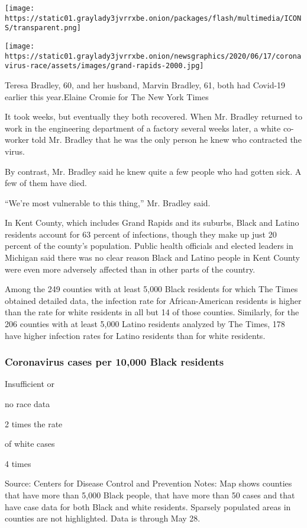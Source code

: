 \texttt{[image: https://static01.graylady3jvrrxbe.onion/packages/flash/multimedia/ICONS/transparent.png]}

\texttt{[image: https://static01.graylady3jvrrxbe.onion/newsgraphics/2020/06/17/coronavirus-race/assets/images/grand-rapids-2000.jpg]}

Teresa Bradley, 60, and her husband, Marvin Bradley, 61, both had
Covid-19 earlier this year.Elaine Cromie for The New York Times

It took weeks, but eventually they both recovered. When Mr. Bradley
returned to work in the engineering department of a factory several
weeks later, a white co-worker told Mr. Bradley that he was the only
person he knew who contracted the virus.

By contrast, Mr. Bradley said he knew quite a few people who had gotten
sick. A few of them have died.

``We're most vulnerable to this thing,'' Mr. Bradley said.

In Kent County, which includes Grand Rapids and its suburbs, Black and
Latino residents account for 63 percent of infections, though they make
up just 20 percent of the county's population. Public health officials
and elected leaders in Michigan said there was no clear reason Black and
Latino people in Kent County were even more adversely affected than in
other parts of the country.

Among the 249 counties with at least 5,000 Black residents for which The
Times obtained detailed data, the infection rate for African-American
residents is higher than the rate for white residents in all but 14 of
those counties. Similarly, for the 206 counties with at least 5,000
Latino residents analyzed by The Times, 178 have higher infection rates
for Latino residents than for white residents.

\hypertarget{coronavirus-cases-per-10000-black-residents}{%
\subsubsection{Coronavirus cases per 10,000 Black
residents}\label{coronavirus-cases-per-10000-black-residents}}

Insufficient or

no race data

2 times the rate

of white cases

4 times

Source: Centers for Disease Control and Prevention \textbar{} Notes: Map
shows counties that have more than 5,000 Black people, that have more
than 50 cases and that have case data for both Black and white
residents. Sparsely populated areas in counties are not highlighted.
Data is through May 28.

